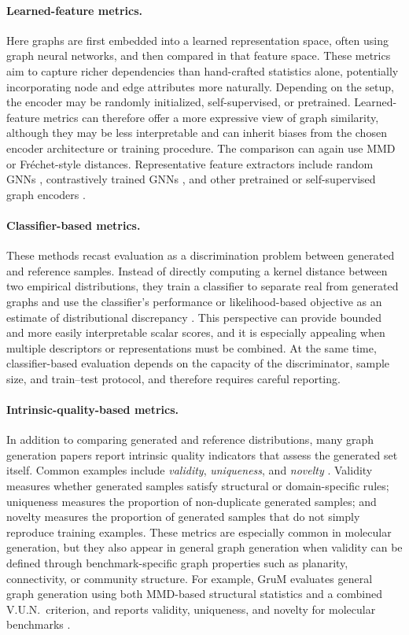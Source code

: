 \documentclass{article}
\begin{document}
\paragraph{Learned-feature metrics.}
Here graphs are first embedded into a learned representation space, often using graph neural networks, and then compared in that feature space. These metrics aim to capture richer dependencies than hand-crafted statistics alone, potentially incorporating node and edge attributes more naturally. Depending on the setup, the encoder may be randomly initialized, self-supervised, or pretrained. Learned-feature metrics can therefore offer a more expressive view of graph similarity, although they may be less interpretable and can inherit biases from the chosen encoder architecture or training procedure. The comparison can again use MMD or Fr\'echet-style distances. Representative feature extractors include random GNNs \cite{thompson2022evaluation}, contrastively trained GNNs \cite{shirzad2022evaluating}, and other pretrained or self-supervised graph encoders \cite{krimmel2025polygraph}.

\paragraph{Classifier-based metrics.}
These methods recast evaluation as a discrimination problem between generated and reference samples. Instead of directly computing a kernel distance between two empirical distributions, they train a classifier to separate real from generated graphs and use the classifier's performance or likelihood-based objective as an estimate of distributional discrepancy \cite{krimmel2025polygraph}. This perspective can provide bounded and more easily interpretable scalar scores, and it is especially appealing when multiple descriptors or representations must be combined. At the same time, classifier-based evaluation depends on the capacity of the discriminator, sample size, and train--test protocol, and therefore requires careful reporting.

\paragraph{Intrinsic-quality-based metrics.}
In addition to comparing generated and reference distributions, many graph generation papers report intrinsic quality indicators that assess the generated set itself. Common examples include \emph{validity}, \emph{uniqueness}, and \emph{novelty} \cite{guo2022systematic}. Validity measures whether generated samples satisfy structural or domain-specific rules; uniqueness measures the proportion of non-duplicate generated samples; and novelty measures the proportion of generated samples that do not simply reproduce training examples. These metrics are especially common in molecular generation, but they also appear in general graph generation when validity can be defined through benchmark-specific graph properties such as planarity, connectivity, or community structure. For example, GruM evaluates general graph generation using both MMD-based structural statistics and a combined V.U.N.\ criterion, and reports validity, uniqueness, and novelty for molecular benchmarks \cite{jo2024grum}.
\end{document}
